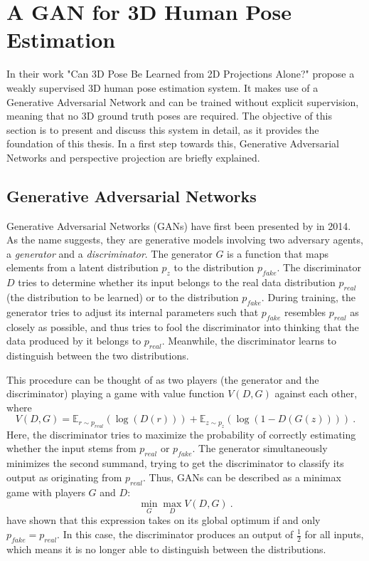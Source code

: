 \section{A GAN for 3D Human Pose Estimation}
\label{sec:network}
In their work "Can 3D Pose Be Learned from 2D Projections Alone?" \citet{drover18} propose a weakly supervised 3D human pose estimation system.
It makes use of a Generative Adversarial Network and can be trained without explicit supervision, meaning that no 3D ground truth poses are required.
The objective of this section is to present and discuss this system in detail, as it provides the foundation of this thesis.
In a first step towards this, Generative Adversarial Networks and perspective projection are  briefly explained.

\subsection{Generative Adversarial Networks}
Generative Adversarial Networks (GANs) have first been presented by \citet{goodfellow14} in 2014.
As the name suggests, they are generative models involving two adversary agents, a \emph{generator} and a \emph{discriminator}.
The generator $G$ is a function that maps elements from a latent distribution $p_z$ to the distribution $p_{fake}$.
The discriminator $D$ tries to determine whether its input belongs to the real data distribution $p_{real}$ (the distribution to be learned) or to the distribution $p_{fake}$.
During training, the generator tries to adjust its internal parameters such that $p_{fake}$ resembles $p_{real}$ as closely as possible, and thus tries to fool the discriminator into thinking that the data produced by it belongs to $p_{real}$.
Meanwhile, the discriminator learns to distinguish between the two distributions.

This procedure can be thought of as two players (the generator and the discriminator) playing a game with value function $V(D, G)$ against each other, where
\begin{equation}
	V(D, G) = \mathbb{E}_{r\sim p_{real}}(\log(D(r))) + \mathbb{E}_{z\sim p_{z}}(\log(1 - D(G(z)))) \ .
\end{equation}
Here, the discriminator tries to maximize the probability of correctly estimating whether the input stems from $p_{real}$ or $p_{fake}$.
The generator simultaneously minimizes the second summand, trying to get the discriminator to classify its output as originating from $p_{real}$.
Thus, GANs can be described as a minimax game with players $G$ and $D$:
\begin{equation}
\min_G \max_D V(D, G) \ .
\end{equation}
\citet{goodfellow14} have shown that this expression takes on its global optimum if and only $p_{fake} = p_{real}$.
In this case, the discriminator produces an output of $\frac{1}{2}$ for all inputs, which means it is no longer able to distinguish between the distributions.

